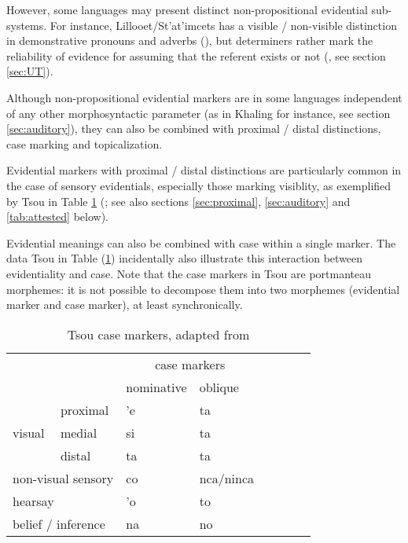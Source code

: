 \documentclass[oneside,a4paper,11pt]{article}
\newcommand{\ipa}[1]{{\phon \mbox{#1}}} %
\begin{document}
However, some languages may present distinct non-propositional evidential sub-systems. For instance, Lillooet/St'at'imcets has a visible / non-visible distinction in demonstrative pronouns and adverbs (\citealt[169, 171]{eijk97lillooet}), but determiners rather mark the reliability of evidence for assuming that the referent exists or not (\citealt{matthewson98determiners, gutierrez12determiners}, see section \ref{sec:UT}).

Although non-propositional evidential markers are in some languages independent of any other morphosyntactic parameter (as in Khaling for instance, see section \ref{sec:auditory}), they can also be combined with  proximal / distal distinctions, case marking and topicalization.

Evidential markers with proximal / distal distinctions are particularly common in the case of sensory evidentials, especially those marking visiblity, as exemplified by Tsou in Table \ref{tab:tsou} (\citealt{tung64tsou, yang00tsou.case}; see also sections \ref{sec:proximal}, \ref{sec:auditory} and \ref{tab:attested} below). 

Evidential meanings can also be combined with case within a single marker. The data Tsou in Table (\ref{tab:tsou}) incidentally also illustrate this interaction between evidentiality and case. Note that the case markers in Tsou are portmanteau morphemes: it is not possible to decompose them into two morphemes (evidential marker and case marker), at least synchronically.  
 
\begin{table}[H]
 \caption{Tsou case markers, adapted from \citet[54]{yang00tsou.case}} \centering \label{tab:tsou}
\begin{tabular}{llllllll}
\toprule
	 & 	 & 	\multicolumn{2}{c}{case markers } 	 \\	
	 & 	 & 	nominative & 	oblique \\	
\midrule
	 & 	proximal & 	\ipa{'e} & 	\ipa{ta} \\ 	
visual	 & 	medial & 	\ipa{si} & 	\ipa{ta}  \\ 	
	 & 	distal & 	\ipa{ta} & 	\ipa{ta}  \\ 	
\multicolumn{2}{l}{non-visual sensory}  	 & 	\ipa{co} & 	\ipa{nca/ninca} \\ 	
	 \midrule
\multicolumn{2}{l}{hearsay}	 & 	\ipa{'o} & 	\ipa{to} \\ 	
\multicolumn{2}{l}{belief / inference} 	 & 	\ipa{na} & 	\ipa{no} \\ 	
\bottomrule
\end{tabular}
\end{table} 
\end{document}
